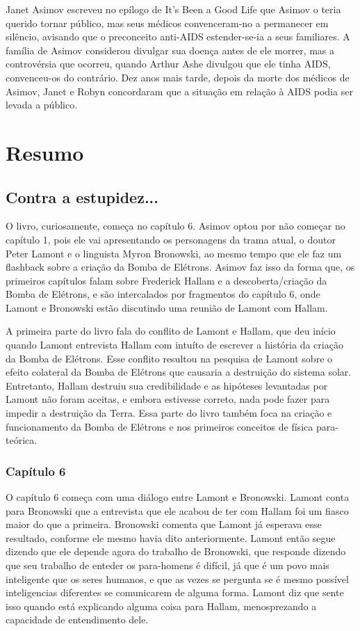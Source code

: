 \documentclass[14pt,portuguese]{extreport}
\begin{document}
      Janet Asimov escreveu no epílogo de It's Been a Good Life que
      Asimov o teria querido tornar público, mas seus médicos
      convenceram-no a permanecer em silêncio, avisando que o
      preconceito anti-AIDS estender-se-ia a seus familiares. A família de
      Asimov considerou divulgar sua doença antes de ele morrer, mas a
      controvérsia que ocorreu, quando Arthur Ashe divulgou que ele
      tinha AIDS, convenceu-os do contrário. Dez anos mais tarde, depois
      da morte dos médicos de Asimov, Janet e Robyn concordaram que a
      situação em relação à AIDS podia ser levada a público.
      
  \chapter{Resumo}

    \section{Contra a estupidez...}
    
	O livro, curiosamente, começa no capítulo 6. Asimov optou por não começar no capítulo 1, pois ele vai apresentando os personagens da trama atual, o doutor Peter Lamont e o linguista Myron Bronowski, 
	ao mesmo tempo que ele faz um flashback sobre a criação da Bomba de Elétrons. Asimov faz isso da forma que, os primeiros capítulos falam sobre Frederick 
	Hallam e a descoberta/criação da Bomba de Elétrons, e são intercalados por fragmentos do capítulo 6, onde Lamont e Bronowski estão discutindo uma reunião de Lamont com Hallam.
	
	A primeira parte do livro fala do conflito de Lamont e Hallam, que deu início quando Lamont entrevista Hallam com intuíto de escrever a história da criação da Bomba de Elétrons. 
	Esse conflito resultou na pesquisa de Lamont sobre o efeito colateral da Bomba de Elétrons que causaria a destruição do sistema solar. 
	Entretanto, Hallam destruiu sua credibilidade e as hipóteses levantadas por Lamont não foram aceitas, e embora estivesse correto, nada pode fazer para impedir a destruição da Terra. 
	Essa parte do livro também foca na criação e funcionamento da Bomba de Elétrons e nos primeiros conceitos de física para-teórica.

	\subsection {Capítulo 6}

	  O capítulo 6 começa com uma diálogo entre Lamont e Bronowski. 
	  Lamont conta para Bronowski que a entrevista que ele acabou de ter com Hallam foi um fiasco maior do que a primeira. 
	  Bronowski comenta que Lamont já esperava esse resultado, conforme ele mesmo havia dito anteriormente. 
	  Lamont então segue dizendo que ele depende agora do trabalho de Bronowski, que responde dizendo que seu trabalho de enteder os para-homens é difícil, 
	  já que é um povo mais inteligente que os seres humanos, e que as vezes se pergunta se é mesmo possível inteligencias diferentes se comunicarem de alguma forma. 
	  Lamont diz que sente isso quando está explicando alguma coisa para Hallam, menosprezando a capacidade de entendimento dele.
\end{document}

